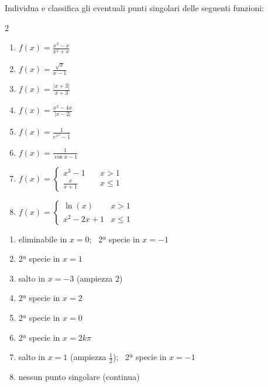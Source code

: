 \begin{question}[ID=2.3, subtitle={Punti singolari — serie 3}, tags={continuità, punti singolari}, difficulty=media]
Individua e classifica gli eventuali punti singolari delle seguenti funzioni:
\begin{center}\begin{minipage}{0.92\linewidth}
\begin{multicols}{2}
\begin{enumerate}[label=\arabic*),leftmargin=3.2cm]
\item $f(x) = \frac{x^2 - x}{x^2 + x}$
\item $f(x) = \frac{\sqrt{x}}{x-1}$
\item $f(x) = \frac{|x+3|}{x+3}$
\item $f(x) = \frac{x^2 - 4x}{|x-2|}$
\item $f(x) = \frac{1}{e^{x^2}-1}$
\item $f(x) = \frac{1}{\cos x - 1}$
\item $f(x) = \begin{cases} x^3 - 1 \quad & x > 1 \\ \frac{x}{x+1} \quad & x \le 1 \end{cases}$
\item $f(x) = \begin{cases} \ln(x) & x > 1 \\ x^2 - 2x + 1 & x \le 1 \end{cases}$
\end{enumerate}
\end{multicols}
\end{minipage}\end{center}
\begin{solution}
\begin{enumerate}[label=\arabic*)]
    \item eliminabile in $x=0$; \ 2ª specie in $x=-1$
    \item 2ª specie in $x=1$
    \item salto in $x=-3$ (ampiezza $2$)
    \item 2ª specie in $x=2$
    \item 2ª specie in $x=0$
    \item 2ª specie in $x=2k\pi$
    \item salto in $x=1$ (ampiezza $\tfrac12$); \ 2ª specie in $x=-1$
    \item nessun punto singolare (continua)
\end{enumerate}
\end{solution}
\begin{explanation}

\end{explanation}
\end{question}

